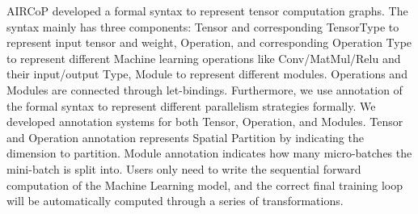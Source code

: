 \documentclass[sigplan, nonacm]{acmart}\settopmatter{printfolios=true,printccs=false,printacmref=false}
\begin{document}
 AIRCoP developed a formal syntax to represent tensor computation graphs. The syntax mainly has three components: Tensor and corresponding TensorType to represent input tensor and weight, Operation, and corresponding Operation Type to represent different Machine learning operations like Conv/MatMul/Relu and their input/output Type, Module to represent different modules. Operations and Modules are connected through let-bindings. Furthermore, we use annotation of the formal syntax to represent different parallelism strategies formally. We developed annotation systems for both Tensor, Operation, and Modules. Tensor and Operation annotation represents Spatial Partition by indicating the dimension to partition. Module annotation indicates how many micro-batches the mini-batch is split into. Users only need to write the sequential forward computation of the Machine Learning model, and the correct final training loop will be automatically computed through a series of transformations.
\end{document}

